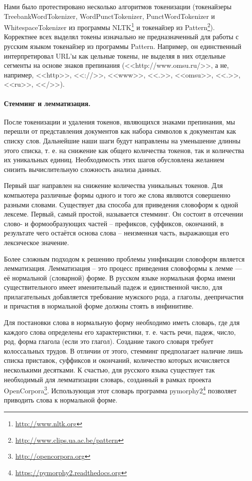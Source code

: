 Нами было протестировано несколько алгоритмов токенизации (токенайзеры TreebankWordTokenizer, WordPunctTokenizer, PunctWordTokenizer и WhitespaceTokenizer из программы NLTK\footnote{\href{http://www.nltk.org}{http://www.nltk.org}} и токенайзер из Pattern\footnote{\href{http://www.clips.ua.ac.be/pattern}{http://www.clips.ua.ac.be/pattern}}). Корректнее всех выделял токены изначально не предназначенный для работы с русским языком токенайзер из программы Pattern. Например, он единственный интерпретировал URL'ы как цельные токены, не выделяя в них отдельные сегменты на основе знаков препинания (<<http://www.omsu.ru/>>, а не, например, <<http>>, <<://>>, <<www>>, <<.>>, <<omsu>>, <<.>>, <<ru>>, <</>>).

\paragraph{Стемминг и лемматизация.}
После токенизации и удаления токенов, являющихся знаками препинания, мы перешли от представления документов как набора символов к документам как списку слов. Дальнейшие наши шаги будут направлены на уменьшение длинны этого списка, т. е. на снижение как общего количества токенов, так и количества их уникальных единиц. Необходимость этих шагов обусловлена желанием снизить вычислительную сложность анализа данных.

Первый шаг направлен на снижение количества уникальных токенов. Для компьютера различные формы одного и того же слова являются совершенно разными словами. Существует два способа для приведения словоформ к одной лексеме. Первый, самый простой, называется стемминг. Он состоит в отсечении слово- и формообразующих частей -- префиксов, суффиксов, окончаний, в результате чего остаётся основа слова -- неизменная часть, выражающая его лексическое значение.

Более сложным подходом к решению проблемы унификации словоформ является лемматизация. Лемматизация -- это процесс приведения словоформы к лемме — её нормальной (словарной) форме. В русском языке нормальная форма имени существительного имеет именительный падеж и единственной число, для прилагательных добавляется требование мужского рода, а глаголы, деепричастия и причастия в нормальной форме должны стоять в инфинитиве.

Для постановки слова в нормальную форму необходимо иметь словарь, где для каждого слова определены его характеристики, т. е. часть речи, падеж, число, род, форма глагола (если это глагол). Создание такого словаря требует колоссальных трудов. В отличии от этого, стемминг предполагает наличие лишь списка приставок, суффиксов и окончаний, количество которых исчисляется несколькими десятками. К счастью, для русского языка существует так необходимый для лемматизации словарь, созданный в рамках проекта OpenCorpora\footnote{\href{http://opencorpora.org}{http://opencorpora.org}}. Использующая этот словарь программа pymorphy2\footnote{\href{https://pymorphy2.readthedocs.org}{https://pymorphy2.readthedocs.org}} позволяет приводить слова к нормальной форме.

